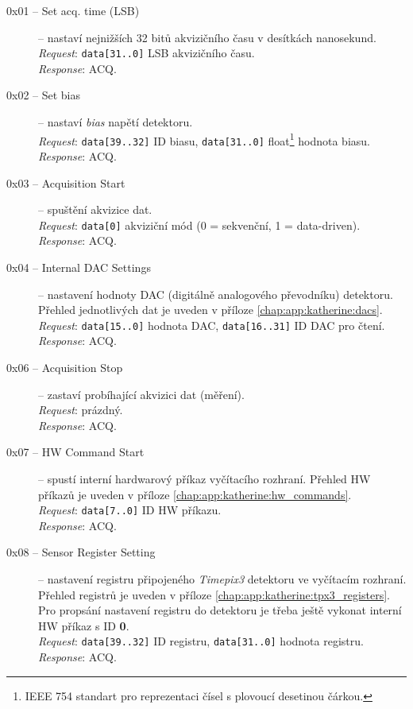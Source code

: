 \begin{description}
    \item[0x01 -- Set acq. time (LSB)] -- nastaví nejnižších 32 bitů akvizičního času v desítkách nanosekund.
    \\\textit{Request}: \texttt{data[31..0]} LSB akvizičního času.
    \\\textit{Response}: ACQ.

    \item[0x02 -- Set bias] -- nastaví \textit{bias} napětí detektoru.
    \\\textit{Request}: \texttt{data[39..32]} ID biasu, \texttt{data[31..0]} float\footnote{IEEE 754 standart pro reprezentaci čísel s plovoucí desetinou čárkou.} hodnota biasu.
    \\\textit{Response}: ACQ.
    
    \item[0x03 -- Acquisition Start] -- spuštění akvizice dat.
    \\\textit{Request}: \texttt{data[0]} akviziční mód (0 = sekvenční, 1 = data-driven).
    \\\textit{Response}: ACQ.
    
    \item[0x04 -- Internal DAC Settings] -- nastavení hodnoty DAC (digitálně analogového převodníku) detektoru. Přehled jednotlivých dat je uveden v příloze \ref{chap:app:katherine:dacs}.
    \\\textit{Request}: \texttt{data[15..0]} hodnota DAC, \texttt{data[16..31]} ID DAC pro čtení.
    \\\textit{Response}: ACQ.

    
    \item[0x06 -- Acquisition Stop] -- zastaví probíhající akvizici dat (měření).
    \\\textit{Request}: prázdný.
    \\\textit{Response}: ACQ.
    
    \item[0x07 -- HW Command Start] -- spustí interní hardwarový příkaz vyčítacího rozhraní. Přehled HW příkazů je uveden v příloze \ref{chap:app:katherine:hw_commands}.
    \\\textit{Request}: \texttt{data[7..0]} ID HW příkazu.
    \\\textit{Response}: ACQ.

    \item[0x08 -- Sensor Register Setting] -- nastavení registru připojeného \textit{Timepix3} detektoru ve vyčítacím rozhraní. Přehled registrů je uveden v příloze \ref{chap:app:katherine:tpx3_registers}. Pro propsání nastavení registru do detektoru je třeba ještě vykonat interní HW příkaz s ID \textbf{0}.
    \\\textit{Request}: \texttt{data[39..32]} ID registru, \texttt{data[31..0]} hodnota registru.
    \\\textit{Response}: ACQ.
    

\end{description}

